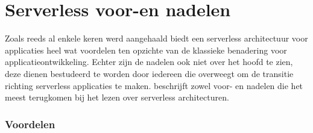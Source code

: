 \section{Serverless voor-en nadelen}
Zoals reeds al enkele keren werd aangehaald biedt een serverless architectuur voor applicaties heel wat voordelen ten opzichte van de klassieke benadering voor applicatieontwikkeling. Echter zijn de nadelen ook niet over het hoofd te zien, deze dienen bestudeerd te worden door iedereen die overweegt om de transitie richting serverless applicaties te maken. \textcite{Stigler2017} beschrijft zowel voor- en nadelen die het meest terugkomen bij het lezen over serverless architecturen.

\subsubsection{Voordelen}

